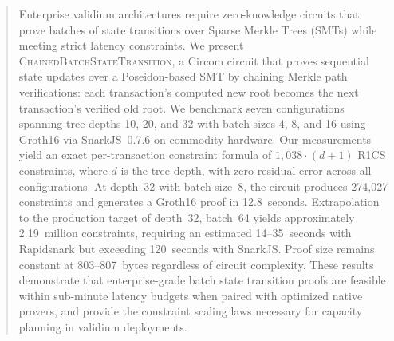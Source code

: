 \begin{abstract}
Enterprise validium architectures require zero-knowledge circuits that prove
batches of state transitions over Sparse Merkle Trees (SMTs) while meeting
strict latency constraints. We present \textsc{ChainedBatchStateTransition},
a Circom circuit that proves sequential state updates over a Poseidon-based
SMT by chaining Merkle path verifications: each transaction's computed new
root becomes the next transaction's verified old root. We benchmark seven
configurations spanning tree depths 10, 20, and 32 with batch sizes 4, 8,
and 16 using Groth16 via SnarkJS~0.7.6 on commodity hardware. Our
measurements yield an exact per-transaction constraint formula of
$1{,}038 \cdot (d+1)$ R1CS constraints, where $d$ is the tree depth,
with zero residual error across all configurations. At depth~32 with
batch size~8, the circuit produces 274,027 constraints and generates a
Groth16 proof in 12.8~seconds. Extrapolation to the production target of
depth~32, batch~64 yields approximately 2.19~million constraints, requiring
an estimated 14--35~seconds with Rapidsnark but exceeding 120~seconds with
SnarkJS. Proof size remains constant at 803--807~bytes regardless of
circuit complexity. These results demonstrate that enterprise-grade
batch state transition proofs are feasible within sub-minute latency
budgets when paired with optimized native provers, and provide the
constraint scaling laws necessary for capacity planning in validium
deployments.
\end{abstract}
